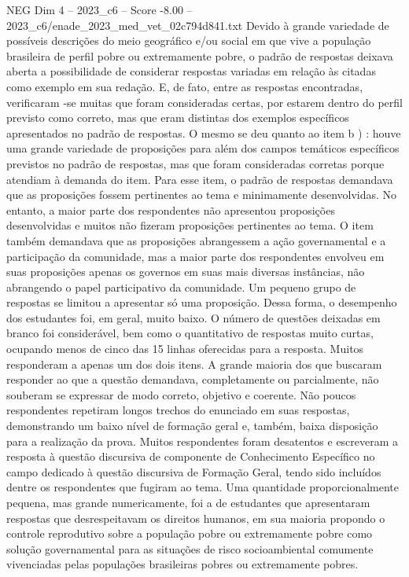 \begin{textsample}{NEG Dim 4 – 2023\_c6 – Score -8.00 – 2023\_c6/enade\_2023\_med\_vet\_02c794d841.txt}
Devido à grande variedade de possíveis descrições do meio geográfico e/ou social em que vive a população brasileira de perfil pobre ou extremamente pobre, o padrão de respostas deixava aberta a possibilidade de considerar respostas variadas em relação às citadas como exemplo em sua redação.
E, de fato, entre as respostas encontradas, verificaram -se muitas que foram consideradas certas, por estarem dentro do perfil previsto como correto, mas que eram distintas dos exemplos específicos apresentados no padrão de respostas.
O mesmo se deu quanto ao item b ) : houve uma grande variedade de proposições para além dos campos temáticos específicos previstos no padrão de respostas, mas que foram consideradas corretas porque atendiam à demanda do item.
Para esse item, o padrão de respostas demandava que as proposições fossem pertinentes ao tema e minimamente desenvolvidas.
No entanto, a maior parte dos respondentes não apresentou proposições desenvolvidas e muitos não fizeram proposições pertinentes ao tema.
O item também demandava que as proposições abrangessem a ação governamental e a participação da comunidade, mas a maior parte dos respondentes envolveu em suas proposições apenas os governos em suas mais diversas instâncias, não abrangendo o papel participativo da comunidade.
Um pequeno grupo de respostas se limitou a apresentar só uma proposição.
Dessa forma, o desempenho dos estudantes foi, em geral, muito baixo.
O número de questões deixadas em branco foi considerável, bem como o quantitativo de respostas muito curtas, ocupando menos de cinco das 15 linhas oferecidas para a resposta.
Muitos responderam a apenas um dos dois itens.
A grande maioria dos que buscaram responder ao que a questão demandava, completamente ou parcialmente, não souberam se expressar de modo correto, objetivo e coerente.
Não poucos respondentes repetiram longos trechos do enunciado em suas respostas, demonstrando um baixo nível de formação geral e, também, baixa disposição para a realização da prova.
Muitos respondentes foram desatentos e escreveram a resposta à questão discursiva de componente de Conhecimento Específico no campo dedicado à questão discursiva de Formação Geral, tendo sido incluídos dentre os respondentes que fugiram ao tema.
Uma quantidade proporcionalmente pequena, mas grande numericamente, foi a de estudantes que apresentaram respostas que desrespeitavam os direitos humanos, em sua maioria propondo o controle reprodutivo sobre a população pobre ou extremamente pobre como solução governamental para as situações de risco socioambiental comumente vivenciadas pelas populações brasileiras pobres ou extremamente pobres.

\end{textsample}
